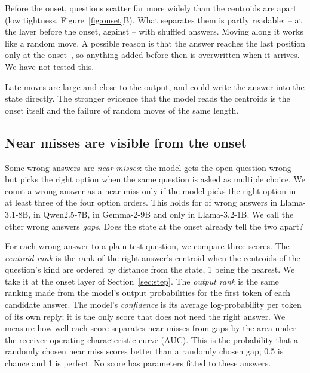 Before the onset, questions scatter far more widely than the centroids are apart (low tightness, Figure~\ref{fig:onset}B). What separates them is partly readable: \JumpFromMin{}--\JumpFromMax{} at the layer before the onset, against \ShuffledMin{}--\ShuffledMax{} with shuffled answers. Moving along it works like a random move. A possible reason is that the answer reaches the last position only at the onset~\citep{geva2023dissecting}, so anything added before then is overwritten when it arrives. We have not tested this.

Late moves are large and close to the output, and could write the answer into the state directly. The stronger evidence that the model reads the centroids is the onset itself and the failure of random moves of the same length.

\subsection{Near misses are visible from the onset}
\label{sec:errors}

Some wrong answers are \emph{near misses}: the model gets the open question wrong but picks the right option when the same question is asked as multiple choice. We count a wrong answer as a near miss only if the model picks the right option in at least three of the four option orders. This holds for \ErrPosLlama{} of wrong answers in Llama-3.1-8B, \ErrPosQwen{} in Qwen2.5-7B, \ErrPosGemma{} in Gemma-2-9B and only \ErrPosLlamaSmall{} in Llama-3.2-1B. We call the other wrong answers \emph{gaps}. Does the state at the onset already tell the two apart?

For each wrong answer to a plain test question, we compare three scores. The \emph{centroid rank} is the rank of the right answer's centroid when the centroids of the question's kind are ordered by distance from the state, 1 being the nearest. We take it at the onset layer of Section~\ref{sec:step}. The \emph{output rank} is the same ranking made from the model's output probabilities for the first token of each candidate answer. The model's \emph{confidence} is its average log-probability per token of its own reply; it is the only score that does not need the right answer. We measure how well each score separates near misses from gaps by the area under the receiver operating characteristic curve (AUC). This is the probability that a randomly chosen near miss scores better than a randomly chosen gap; 0.5 is chance and 1 is perfect. No score has parameters fitted to these answers.

